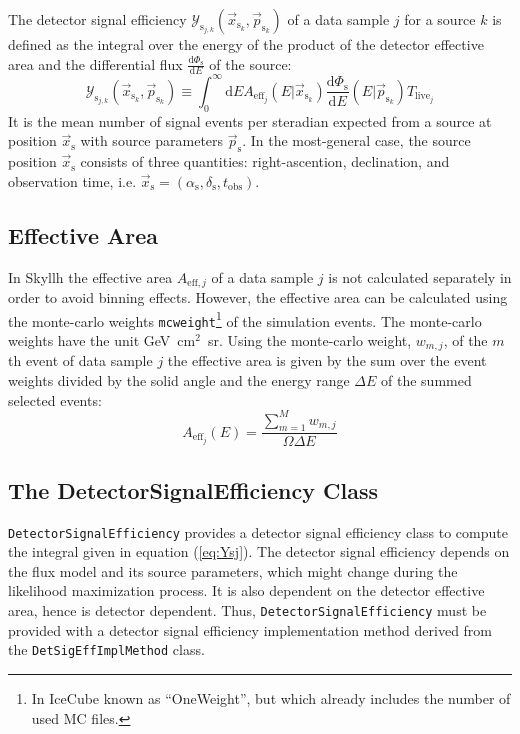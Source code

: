 \documentclass{article}
\newcommand{\eq}[1]{(\ref{#1})}
\newcommand{\code}[1]{\texttt{#1}}
\newcommand{\class}[1]{\colorbox{blue!30}{\code{#1}}}
\newcommand{\ps}{\vec{p}_{\mathrm{s}}}
\newcommand{\psk}{\vec{p}_{\mathrm{s}_k}}
\newcommand{\xs}{\vec{x}_{\mathrm{s}}}
\newcommand{\xsk}{\vec{x}_{\mathrm{s}_k}}
\begin{document}
The detector signal efficiency $\mathcal{Y}_{\mathrm{s}_{j,k}}(\xsk,\psk)$
of a data sample $j$ for a source $k$ is defined as the integral over the energy
of the product of the detector effective area and the differential flux
$\frac{\mathrm{d}\Phi_{\mathrm{s}}}{\mathrm{d}E}$ of the source:
\begin{equation}
 \mathcal{Y}_{\mathrm{s}_{j,k}}(\xsk,\psk) \equiv \int_0^\infty \mathrm{d}E A_{\mathrm{eff}_j}(E|\xsk) \frac{\mathrm{d}\Phi_{\mathrm{s}}}{\mathrm{d}E}(E|\psk) T_{\mathrm{live}_j}
\label{eq:Ysj}
\end{equation}
It is the mean number of signal events per steradian expected from a source at
position $\xs$ with source parameters $\ps$. In the most-general case,
the source position $\xs$ consists of three quantities: right-ascention,
declination, and observation time, i.e.
$\xs = (\alpha_{\mathrm{s}},\delta_{\mathrm{s}},t_{\mathrm{obs}})$.

\subsection{Effective Area}

In Skyllh the effective area $A_{\mathrm{eff},j}$ of a data sample $j$ is not
calculated separately in order to avoid binning effects. However, the effective
area can be calculated using the monte-carlo weights \code{mcweight}\footnote{In IceCube
known as ``OneWeight'', but which already includes the number of used MC files.}
of the simulation events.
The monte-carlo weights have the unit GeV~cm$^2$~sr.
Using the monte-carlo weight, $w_{m,j}$, of the $m$th event of data sample $j$
the effective area is given by the sum over the event weights divided by the
solid angle and the energy range $\Delta E$ of the summed selected events:
\begin{equation}
 A_{\mathrm{eff}_j}(E) = \frac{\sum_{m=1}^{M} w_{m,j}}{\Omega \Delta E}
\end{equation}


\subsection{The DetectorSignalEfficiency Class}

\class{DetectorSignalEfficiency} provides a detector signal efficiency class to
compute the integral given in equation \eq{eq:Ysj}. The detector signal
efficiency depends on the flux model and its source parameters, which might
change during the likelihood maximization process. It is also dependent on the
detector effective area, hence is detector dependent. Thus,
\class{DetectorSignalEfficiency} must be provided with a detector signal
efficiency implementation method derived from the \class{DetSigEffImplMethod}
class.
\end{document}

